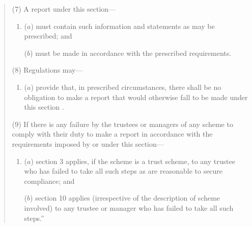 \documentclass[12pt,a4paper]{article}
\begin{document}
\begin{quotation}
%
%

(7) A report under this section—
\begin{enumerate}\item[]
($a$) must contain such information and statements as may be prescribed; and

($b$) must be made in accordance with the prescribed requirements.
\end{enumerate}

(8) Regulations may—
\begin{enumerate}\item[]
($a$) provide that, in prescribed circumstances, there shall be no obligation to make a report that would otherwise fall to be made under this section%
%
%
.
\end{enumerate}

(9) If there is any failure by the trustees or managers of any scheme to comply with their duty to make a report in accordance with the requirements imposed by or under this section—
\begin{enumerate}\item[]
($a$) section 3 applies, if the scheme is a trust scheme, to any trustee who has failed to take all such steps as are reasonable to secure compliance; and

($b$) section 10 applies (irrespective of the description of scheme involved) to any trustee or manager who has failed to take all such steps.”
\end{enumerate}
\end{quotation}
\end{document}
